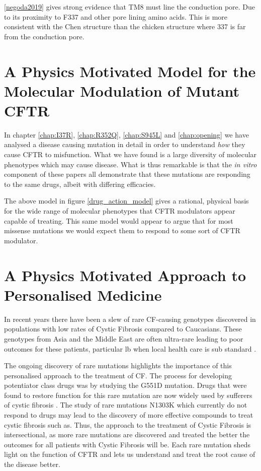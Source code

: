 \ref{negoda2019} gives strong evidence that TM8 must line the conduction pore. Due to its proximity to F337 and other pore lining amino acids. This is more consistent with the Chen structure than the chicken structure where 337 is far from the conduction pore.

\section{A Physics Motivated Model for the Molecular Modulation of Mutant CFTR }
In chapter \ref{chap:I37R}, \ref{chap:R352Q}, \ref{chap:S945L} and \ref{chap:opening} we have analysed a disease causing mutation in detail in order to understand \textit{how} they cause CFTR to misfunction. What we have found is a large diversity of molecular phenotypes which may cause disease. What is thus remarkable is that the \textit{in vitro} component of these papers all demonstrate that these mutations are responding to the same drugs, albeit with differing efficacies.



The above model in figure \ref{drug_action_model} gives a rational, physical basis for the wide range of molecular phenotypes that CFTR modulators appear capable of treating. This same model would appear to argue that for most missense mutations we would expect them to respond to some sort of CFTR modulator.

\section{A Physics Motivated Approach to Personalised Medicine}


In recent years there have been a slew of rare CF-causing genotypes discovered in populations with low rates of Cystic Fibrosis compared to Caucasians. These genotypes from Asia and the Middle East are often ultra-rare leading to poor outcomes for these patients, particular lb when local health care is sub standard \cite{}. 

The ongoing discovery of rare mutations highlights the importance of this personalised approach to the treatment of CF. The process for developing potentiator class drugs was by studying the G551D mutation. Drugs that were found to restore function for this rare mutation are now widely used by sufferers of cystic fibrosis \cite{}. The study of rare mutations N1303K which currently do not respond to drugs may lead to the discovery of more effective compounds to treat cystic fibrosis such as. Thus, the approach to the treatment of Cystic Fibrosis is intersectional, as more rare mutations are discovered and treated the better the outcomes for all patients with Cystic Fibrosis will be. Each rare mutation sheds light on the function of CFTR and lets us understand and treat the root cause of the disease better.



